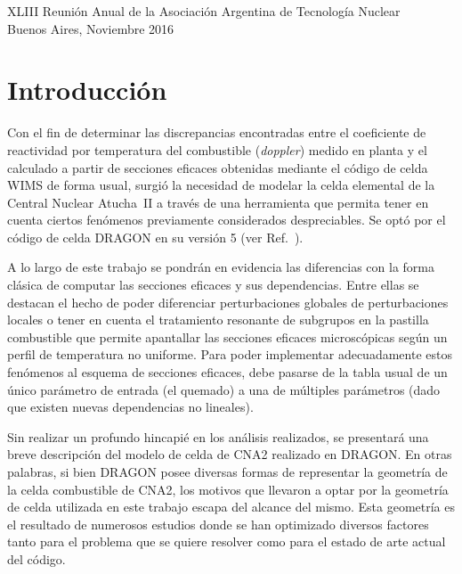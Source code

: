 \documentclass[11pt]{article}
\begin{document}
\begin{center}
\vfill

\begin{center}
\begin{small}
XLIII Reunión Anual de la Asociación Argentina de Tecnología Nuclear\\
Buenos Aires, Noviembre 2016
\end{small}
\end{center}

\end{center}

\addtolength{\textheight}{-2cm}

\pagebreak


\tableofcontents
\pagebreak

\section{Introducción}

Con el fin de determinar las discrepancias encontradas entre el coeficiente de reactividad por temperatura del combustible (\emph{doppler}) medido en planta y el calculado a partir de secciones eficaces obtenidas mediante el código de celda WIMS de forma usual, surgió la necesidad de modelar la celda elemental de la Central Nuclear Atucha~II a través de una herramienta que permita tener en cuenta ciertos fenómenos previamente considerados despreciables. Se optó por el código de celda DRAGON en su versión 5 (ver Ref.~\cite{handbook-dragon}).

A lo largo de este trabajo se pondrán en evidencia las diferencias con la forma clásica de computar las secciones eficaces y sus dependencias. Entre ellas se destacan el hecho de poder diferenciar perturbaciones globales de perturbaciones locales o tener en cuenta el tratamiento resonante de subgrupos en la pastilla combustible que permite apantallar las secciones eficaces microscópicas según un perfil de temperatura no uniforme. Para poder implementar adecuadamente estos fenómenos al esquema de secciones eficaces, debe pasarse de la tabla usual de un único parámetro de entrada (el quemado) a una de múltiples parámetros (dado que existen nuevas dependencias no lineales).

Sin realizar un profundo hincapié en los análisis realizados, se presentará una breve descripción del modelo de celda de CNA2 realizado en DRAGON. En otras palabras, si bien DRAGON posee diversas formas de representar la geometría de la celda combustible de CNA2, los motivos que llevaron a optar por la geometría de celda utilizada en este trabajo escapa del alcance del mismo. Esta geometría es el resultado de numerosos estudios donde se han optimizado diversos factores tanto para el problema que se quiere resolver como para el estado de arte actual del código.
\end{document}

